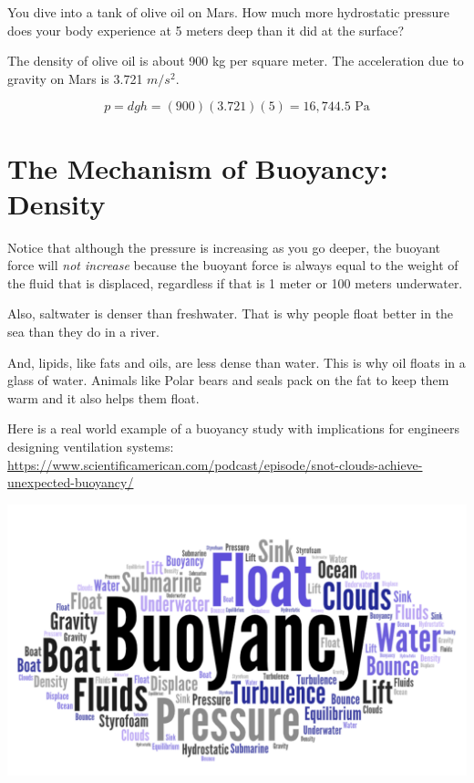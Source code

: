 \begin{Exercise}[title={Hydrostatic Pressure}, label=mars_pressure]

  You dive into a tank of olive oil on Mars. How much more
  hydrostatic pressure does your body experience at 5 meters deep than
  it did at the surface?

  The density of olive oil is about 900 kg per square meter. The
  acceleration due to gravity on Mars is 3.721 $m/s^2$.
  
\end{Exercise}
\begin{Answer}[ref=mars_pressure]
$$p = d g h = (900)(3.721)(5) = 16,744.5 \text{ Pa}$$
\end{Answer}

\section{The Mechanism of Buoyancy: Density}
Notice that although the pressure is increasing as you go deeper, the
buoyant force will \emph{not increase} because the buoyant force is always equal
to the weight of the fluid that is displaced, regardless if that is 1
meter or 100 meters underwater.

Also, saltwater is denser than freshwater. That is why people float
better in the sea than they do in a river.

And, lipids, like fats and oils, are less dense than water. This is why oil floats in a glass of water. Animals like Polar bears and seals pack on the fat to keep them warm and it also helps them float. 

Here is a real world example of a buoyancy study with implications for engineers designing ventilation systems: 
\url{https://www.scientificamerican.com/podcast/episode/snot-clouds-achieve-unexpected-buoyancy/}


\includegraphics[width=1\textwidth]{bouy_word_cloud.png}


